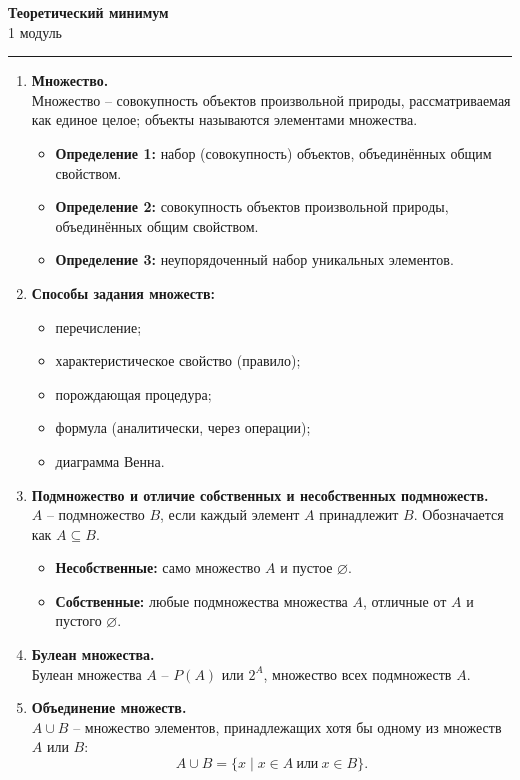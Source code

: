 \documentclass[a4paper,12pt,oneside]{article}
\newcommand{\DefItem}[2]{\item \textbf{#1}\\#2}
\begin{document}
\begin{center}
    {\Large\bfseries Теоретический минимум}\\[2mm]
    {\normalsize 1 модуль}
\end{center}
\vspace{2mm}
\hrule
\vspace{4mm}

\begin{enumerate}[label=\arabic*.]

\DefItem{Множество.}{Множество – совокупность объектов произвольной природы, рассматриваемая как единое целое; объекты называются элементами множества.
\begin{itemize}
\item \textbf{Определение 1:} набор (совокупность) объектов, объединённых общим свойством.
\item \textbf{Определение 2:} совокупность объектов произвольной природы, объединённых общим свойством.
\item \textbf{Определение 3:} неупорядоченный набор уникальных элементов.
\end{itemize}}

\DefItem{Способы задания множеств:}{
\begin{itemize}
\item перечисление;
\item характеристическое свойство (правило);
\item порождающая процедура;
\item формула (аналитически, через операции);
\item диаграмма Венна.
\end{itemize}}

\DefItem{Подмножество и отличие собственных и несобственных подмножеств.}{$A$ – подмножество $B$, если каждый элемент $A$ принадлежит $B$. Обозначается как $A \subseteq B$.
\begin{itemize}
\item \textbf{Несобственные:} само множество $A$ и пустое $\varnothing$.
\item \textbf{Собственные:} любые подмножества множества $A$, отличные от $A$ и пустого $\varnothing$.
\end{itemize}}

\DefItem{Булеан множества.}{Булеан множества $A$ – $P(A)$ или $2^A$, множество всех подмножеств $A$.}

\DefItem{Объединение множеств.}{$A \cup B$ – множество элементов, принадлежащих хотя бы одному из множеств $A$ или $B$:
\[
A \cup B = \{x \mid x \in A \ \text{или}\ x \in B\}.
\]}


\end{enumerate}
\end{document}
